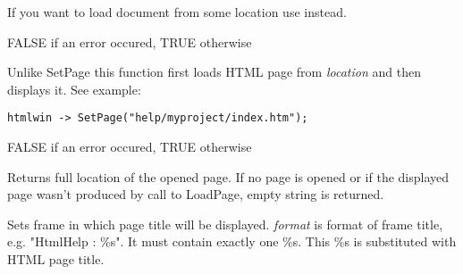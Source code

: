 If you want to load document from some location use
 instead.





FALSE if an error occured, TRUE otherwise

\label{wxhtmlwindowloadpage}


Unlike SetPage this function first loads HTML page from {\it location}
and then displays it. See example:

\begin{verbatim}
htmlwin -> SetPage("help/myproject/index.htm");
\end{verbatim}




FALSE if an error occured, TRUE otherwise



\label{wxhtmlwindowgetopenedpage}


Returns full location of the opened page. If no page is opened or if the displayed page wasn't
produced by call to LoadPage, empty string is returned.



\label{wxhtmlwindowsetrelatedframe}


Sets frame in which page title will be displayed. {\it format} is format of
frame title, e.g. "HtmlHelp : \%s". It must contain exactly one \%s. This
\%s is substituted with HTML page title.




\label{wxhtmlwindowgetrelatedframe}


